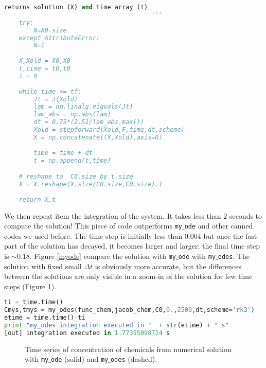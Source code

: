 \documentclass[11pt]{article}
\begin{document}
\begin{enumerate}[label=(\alph*)]
\begin{lstlisting}[language=Python]
    returns solution (X) and time array (t)
                                        '''
    try:
        N=X0.size
    except AttributeError:
        N=1
    
    X,Xold = X0,X0
    t,time = t0,t0
    i = 0
    
    while time <= tf:   
        Jt = J(Xold)
        lam = np.linalg.eigvals(Jt)
        lam_abs = np.abs(lam)
        dt = 0.75*(2.51/lam_abs.max())
        Xold = stepforward(Xold,F,time,dt,scheme)
        X = np.concatenate((X,Xold),axis=0)
        
        time = time + dt
        t = np.append(t,time)

    # reshape to  C0.size by t.size    
    X = X.reshape(X.size/C0.size,C0.size).T
        
    return X,t
\end{lstlisting}

We then repeat item the integration of the system. It takes less than 2 seconds to compute the solution! This piece of code outperforms \texttt{my$\_$ode} and other canned codes we used before. The time step is initially less than $0.004$ but once the fast part of the solution has decayed, it becomes larger and larger; the final time step is $\sim 0.18$. Figure \ref{myode} compare the solution with \texttt{my$\_$ode} with  \texttt{my$\_$odes}. The solution with fixed small $\Delta t$ is obviously more accurate, but the differences between the solutions are only visible in a zoom-in of the solution for few time steps (Figure \ref{myodes}).

\begin{lstlisting}[language=Python]
ti = time.time()
Cmys,tmys = my_odes(func_chem,jacob_chem,C0,0.,2500,dt,scheme='rk3')
etime = time.time()-ti
print "my_odes integration executed in "  + str(etime) + " s"
[out] integration executed in 1.77355098724 s
\end{lstlisting}


\begin{figure}[h]
\centerline{}
\caption{Time series of concentration of chemicals from numerical solution with \texttt{my$\_$ode} (solid) and \texttt{my$\_$odes} (dashed).}
    \label{myodes}
\end{figure}


\end{enumerate}        
\end{document}
